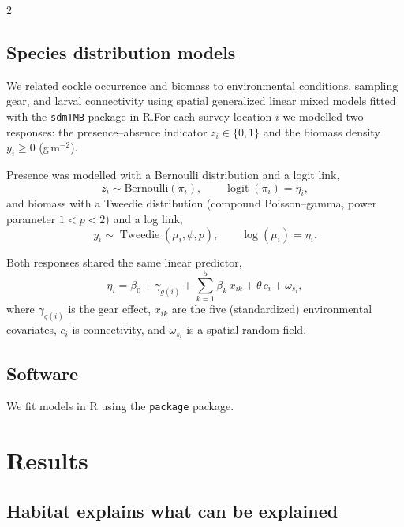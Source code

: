 \begin{spacing}{2}

\subsection{Species distribution models}

We related cockle occurrence and biomass to environmental conditions, sampling gear, and larval connectivity using spatial generalized linear mixed models fitted with the \texttt{sdmTMB} package \citep{anderson2024} in \textsf{R}.For each survey location $i$ we modelled two responses: the presence--absence indicator $z_i\in\{0,1\}$ and the biomass density $y_i\ge 0$ (g\,m$^{-2}$).

Presence was modelled with a Bernoulli distribution and a logit link,
\begin{equation}
z_i \sim \mathrm{Bernoulli}(\pi_i), \qquad \operatorname{logit}(\pi_i) = \eta_i ,
\end{equation}
and biomass with a Tweedie distribution (compound Poisson--gamma, power
parameter $1<p<2$) and a log link,
\begin{equation}
y_i \sim \operatorname{Tweedie}(\mu_i,\phi,p), \qquad \log(\mu_i) = \eta_i .
\end{equation}

Both responses shared the same linear predictor,
\begin{equation}
\eta_i = \beta_0 + \gamma_{g(i)} + \sum_{k=1}^{5}\beta_k\,x_{ik} + \theta\,c_i + \omega_{s_i},
\end{equation}
where $\gamma_{g(i)}$ is the gear effect, $x_{ik}$ are the five (standardized)
environmental covariates, $c_i$ is connectivity, and $\omega_{s_i}$ is a spatial
random field.


\subsection{Software}
We fit models in \textsf{R} \citep{example2020} using the \texttt{package}
package.

\section{Results}
\subsection{Habitat explains what can be explained}


\end{spacing}
